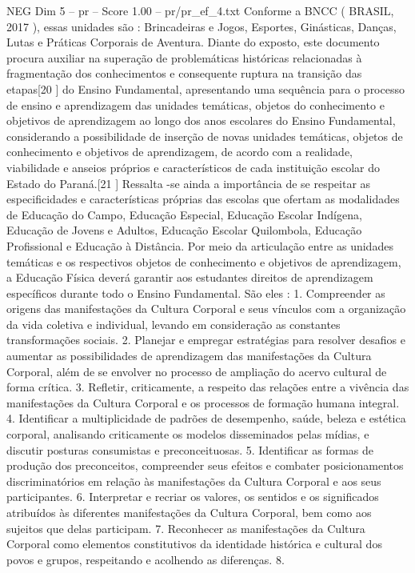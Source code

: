 \begin{textsample}{NEG Dim 5 – pr – Score 1.00 – pr/pr\_ef\_4.txt}
Conforme a BNCC ( BRASIL, 2017 ), essas unidades são : Brincadeiras e Jogos, Esportes, Ginásticas, Danças, Lutas e Práticas Corporais de Aventura.
Diante do exposto, este documento procura auxiliar na superação de problemáticas históricas relacionadas à fragmentação dos conhecimentos e consequente ruptura na transição das etapas[20 ] do Ensino Fundamental, apresentando uma sequência para o processo de ensino e aprendizagem das unidades temáticas, objetos do conhecimento e objetivos de aprendizagem ao longo dos anos escolares do Ensino Fundamental, considerando a possibilidade de inserção de novas unidades temáticas, objetos de conhecimento e objetivos de aprendizagem, de acordo com a realidade, viabilidade e anseios próprios e característicos de cada instituição escolar do Estado do Paraná.[21 ] Ressalta -se ainda a importância de se respeitar as especificidades e características próprias das escolas que ofertam as modalidades de Educação do Campo, Educação Especial, Educação Escolar Indígena, Educação de Jovens e Adultos, Educação Escolar Quilombola, Educação Profissional e Educação à Distância.
Por meio da articulação entre as unidades temáticas e os respectivos objetos de conhecimento e objetivos de aprendizagem, a Educação Física deverá garantir aos estudantes direitos de aprendizagem específicos durante todo o Ensino Fundamental.
São eles : 1.
Compreender as origens das manifestações da Cultura Corporal e seus vínculos com a organização da vida coletiva e individual, levando em consideração as constantes transformações sociais. 2.
Planejar e empregar estratégias para resolver desafios e aumentar as possibilidades de aprendizagem das manifestações da Cultura Corporal, além de se envolver no processo de ampliação do acervo cultural de forma crítica. 3.
Refletir, criticamente, a respeito das relações entre a vivência das manifestações da Cultura Corporal e os processos de formação humana integral. 4.
Identificar a multiplicidade de padrões de desempenho, saúde, beleza e estética corporal, analisando criticamente os modelos disseminados pelas mídias, e discutir posturas consumistas e preconceituosas. 5.
Identificar as formas de produção dos preconceitos, compreender seus efeitos e combater posicionamentos discriminatórios em relação às manifestações da Cultura Corporal e aos seus participantes. 6.
Interpretar e recriar os valores, os sentidos e os significados atribuídos às diferentes manifestações da Cultura Corporal, bem como aos sujeitos que delas participam. 7.
Reconhecer as manifestações da Cultura Corporal como elementos constitutivos da identidade histórica e cultural dos povos e grupos, respeitando e acolhendo as diferenças. 8.

\end{textsample}
